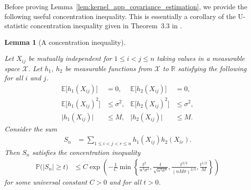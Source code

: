 \documentclass[11pt,lof]{puthesis}
\renewcommand{\P}{\ensuremath{\mathbb{P}}}
\newcommand{\R}{\ensuremath{\mathbb{R}}}
\newcommand{\E}{\ensuremath{\mathbb{E}}}
\newcommand{\cX}{\ensuremath{\mathcal{X}}}
\theoremstyle{break}
\newtheorem{lemma}{Lemma}[section]
\theoremstyle{proof}
\begin{document}
Before proving
Lemma~\ref{lem:kernel_app_covariance_estimation},
we provide the following useful
concentration inequality.
This is essentially a corollary of the
U-statistic concentration inequality given in
Theorem~3.3 in \citet{gine2000exponential}.

\begin{lemma}[A concentration inequality]
\label{lem:kernel_app_dyadic_concentration}

Let $X_{i j}$ be mutually independent for $1 \leq i < j \leq n$
taking values in a measurable space $\cX$.
Let $h_1$, $h_2$ be measurable functions from $\cX$ to $\R$
satisfying the following for all $i$ and $j$.
%
\begin{align*}
\E\big[h_1(X_{i j})\big]
&= 0,
&\E\big[h_2(X_{i j})\big]
&=0, \\
\E\big[h_1(X_{i j})^2\big]
&\leq \sigma^2,
&\E\big[h_2(X_{i j})^2\big]
&\leq \sigma^2, \\
\big|h_1(X_{i j})\big|
&\leq M,
&\big|h_2(X_{i j})\big|
&\leq M.
\end{align*}
%
Consider the sum
%
\begin{align*}
S_n
&=
\sum_{1 \leq i < j < r \leq n}
h_1(X_{i j})
h_2(X_{i r}).
\end{align*}
%
Then $S_n$ satisfies the concentration inequality
%
\begin{align*}
\P\big(
|S_n| \geq t
\big)
&\leq
C \exp\left(
-\frac{1}{C}
\min \left\{
\frac{t^2}{n^3 \sigma^4},
\frac{t}{\sqrt{n^3 \sigma^4}},
\frac{t^{2/3}}{(n M \sigma)^{2/3}},
\frac{t^{1/2}}{M}
\right\}
\right)
\end{align*}
%
for some universal constant
$C > 0$
and for all $t>0$.

\end{lemma}
\end{document}
